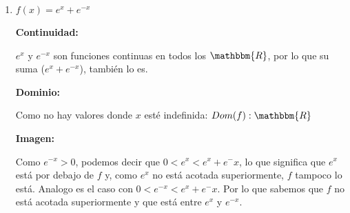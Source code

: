 \documentclass[12pt]{article}
\begin{document}
\begin{enumerate}[\hspace{9px} a)]
        \textbf{Crecencia: }
            \begin{equation*}
                f'(x)>0 \Rightarrow e^{\sin(x)}\cdot\cos(x)>0
            \end{equation*}

            Como \(e^{\sin(x)}\) es mayor a o siempre, \(f'(x)\) ser\'a mayor a 0 cuando \(\cos(x)>0\)\medskip

            Sabemos, por la definici\'on de \(\cos(x)\), que este es mayor a 0 en \(\left(0,\displaystyle\frac{\pi}{2}\right)\cup\left(\frac{3\pi}{2},2\pi\right)\) y que eso se repite cada \(2\pi\) (Por su periodo).\medskip

            Analogo a lo anterior, \(f'(x)<0\) s\'olo cuando \(\cos(x)<0\), que, por definici\'on, sucede en \(\left(\displaystyle\frac{\pi}{2},\frac{3\pi}{2}\right)\) y se repite cada \(2\pi\). Entonces:\medskip

            $f$ es creciente en: \quad \(\left(-\displaystyle\frac{\pi}{2}+2k\pi,\frac{\pi}{2}+2k\pi\right), k\in\mathbbm{Z}\)\medskip

            $f$ es decreciente en: \quad \(\left(\displaystyle\frac{\pi}{2}+2k\pi,\frac{3\pi}{2}+2k\pi\right), k\in\mathbbm{Z}\)\medskip

        \textbf{Puntos y valores de Inflexi\'on: }\medskip

        \textbf{Concavidad y Convexidad: }\medskip
        
        CONCAVIDAD:
        
        CONVEXIDAD:

        \textbf{Gr\'afica: }

    \item \(f(x)=e^x+e^{-x}\)\medskip
    
        \textbf{Continuidad: }\medskip

            \(e^x\) y \(e^{-x}\) son funciones continuas en todos los \(\mathbbm{R}\), por lo que su suma (\(e^x+e^{-x}\)), tambi\'en lo es.\medskip

        \textbf{Dominio: }\medskip

            Como no hay valores donde $x$ est\'e indefinida: \(Dom(f):\mathbbm{R}\)\medskip

        \textbf{Imagen: }\medskip

            Como \(e^{-x}>0\), podemos decir que \(0<e^x<e^x+e^-x\), lo que significa que \(e^x\) est\'a por debajo de \(f\) y, como \(e^x\) no est\'a acotada superiormente, \(f\) tampoco lo est\'a. Analogo es el caso con \(0<e^{-x}<e^x+e^-x\). Por lo que sabemos que \(f\) no est\'a acotada superiormente y que est\'a entre \(e^x\) y \(e^{-x}\).\medskip


\end{enumerate}
\end{document}
